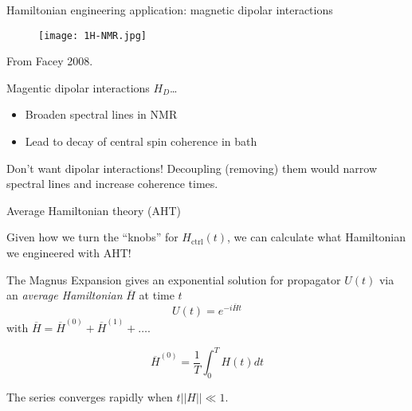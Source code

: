\documentclass{beamer}
\begin{document}
\begin{frame}{Hamiltonian engineering application: magnetic dipolar interactions}

\begin{figure}
\centering
\texttt{[image: 1H-NMR.jpg]}
\hfill
\scalebox{.6}{

}
\end{figure}
\vspace{-1em}
\hspace{3em}
{\scriptsize%
\nocite{Ottowa-NMR}
From Facey 2008.%
}

Magentic dipolar interactions $H_D$\dots
\begin{itemize}
    \item Broaden spectral lines in NMR
    \item Lead to decay of central spin coherence in bath
\end{itemize}

Don't want dipolar interactions! Decoupling (removing) them would narrow spectral lines and increase coherence times.


\end{frame}



\begin{frame}{Average Hamiltonian theory (AHT)}

Given how we turn the ``knobs'' for $H_\text{ctrl}(t)$, we can calculate what Hamiltonian we engineered with AHT!


The Magnus Expansion gives an exponential solution for propagator $U(t)$
via an \emph{average Hamiltonian} $\overline{H}$ at time $t$ \cite{Blanes_2009,2010EJPh...31..907B}
\[
U(t) = e^{-i \overline{H} t}
\]
with $\overline{H} = \overline{H}^{(0)} + \overline{H}^{(1)} + \dots$.

\[
\overline{H}^{(0)} = \frac{1}{T} \int_0^{T}
    H(t) dt
\]

The series converges rapidly when $t||H|| \ll 1$.

\end{frame}
\end{document}

